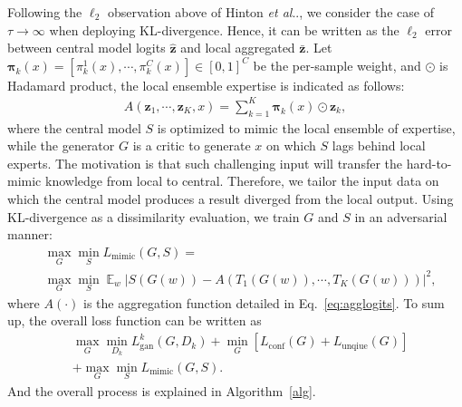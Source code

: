 \documentclass[letterpaper]{article} %
\makeatletter
\DeclareRobustCommand\onedot{\futurelet\@let@token\@onedot}
\def\@onedot{\ifx\@let@token.\else.\null\fi\xspace}
\DeclareMathOperator*{\fe}{\mathbb{E}}
\def\etal{\emph{et al}\onedot}
\newcommand{\Loss}{\mathcal{L}}
\newcommand{\domw}{\mathcal{W}}
\makeatother
\begin{document}
Following the $\ell_2$ observation above of Hinton \etal \cite{hinton2015distilling}, we consider the case of $\tau \rightarrow \infty$ when deploying KL-divergence. Hence, it can be written as the $\ell_2$ error between central model logits $\hat{\bm{z}}$ and local aggregated $\bar{\bm{z}}$. Let $\bm{\pi}_k(x) =[\pi_k^1(x),\cdots,\pi_k^C(x)] \in [0,1]^C$ be the per-sample weight, and $\odot$ is Hadamard product, the local ensemble expertise is indicated as follows:
\begin{equation}
\label{eq:agglogits}
\begin{aligned}
    A(\bm{z}_1, \cdots, \bm{z}_K, x) = \sum_{k=1}^K \bm{\pi}_k(x) \odot \bm{z}_k,
\end{aligned}
\end{equation}
where the central model $S$ is optimized to mimic the local ensemble of expertise, while the generator $G$ is a critic to generate $x$ on which $S$ lags behind local experts. The motivation is that such challenging input will transfer the hard-to-mimic knowledge from local to central. Therefore, we tailor the input data on which the central model produces a result diverged from the local output. Using KL-divergence as a dissimilarity evaluation, we train $G$ and $S$ in an adversarial manner:
\begin{equation}
\label{eq:mimicloss}
\begin{aligned}
    &\max_G \min_S L_\text{mimic}(G, S)
   = \\&\max_G \min_S
   \fe_{w}
   | S(G(w)) - A(T_1(G(w)), \cdots, T_K(G(w)))|^2,
\end{aligned}
\end{equation}
where $A(\cdot)$ is the aggregation function detailed in Eq.~\ref{eq:agglogits}.
To sum up, the overall loss function can be written as
\begin{equation}
\label{eq:overallloss}
\begin{aligned}
   &\max_G \min_{D_k} L_\text{gan}^k(G, D_k) +\min_G [L_\text{conf}(G) + L_\text{unqiue}(G)] \\
   & +\max_G \min_S L_\text{mimic}(G, S).
\end{aligned}
\end{equation}
And the overall process is explained in Algorithm~\ref{alg}.
\end{document}
